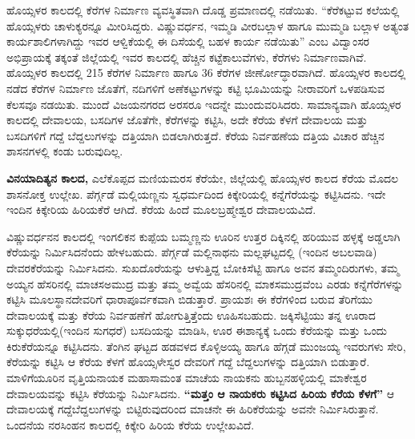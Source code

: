ಹೊಯ್ಸಳರ ಕಾಲದಲ್ಲಿ ಕೆರೆಗಳ ನಿರ್ಮಾಣ ವ್ಯವಸ್ಥಿತವಾಗಿ ದೊಡ್ಡ ಪ್ರಮಾಣದಲ್ಲಿ ನಡೆಯಿತು. “ಕೆರೆಕಟ್ಟುವ ಕಲೆಯಲ್ಲಿ ಹೊಯ್ಸಳರು ಚಾಳುಕ್ಯರನ್ನೂ ಮೀರಿಸಿದ್ದರು. ವಿಷ್ಣುವರ್ಧನ, ಇಮ್ಮಡಿ ವೀರಬಲ್ಲಾಳ ಹಾಗೂ ಮುಮ್ಮಡಿ ಬಲ್ಲಾಳ ಅತ್ಯಂತ ಕಾರ್ಯಶಾಲಿಗಳಾಗಿದ್ದು ಇವರ ಆಳ್ವಿಕೆಯಲ್ಲಿ ಈ ದಿಸೆಯಲ್ಲಿ ಬಹಳ ಕಾರ್ಯ ನಡೆಯಿತು” ಎಂಬ ವಿದ್ವಾಂಸರ ಅಭಿಪ್ರಾಯಕ್ಕೆ ತಕ್ಕಂತೆ ಜಿಲ್ಲೆಯಲ್ಲಿ ಇವರ ಕಾಲದಲ್ಲಿ ಹೆಚ್ಚಿನ ಕಟ್ಟೆಕಾಲುವೆಗಳು, ಕೆರೆಗಳು ನಿರ್ಮಾಣವಾಗಿವೆ. ಹೊಯ್ಸಳರ ಕಾಲದಲ್ಲಿ 215 ಕೆರೆಗಳ ನಿರ್ಮಾಣ ಹಾಗೂ 36 ಕೆರೆಗಳ ಜೀರ್ಣೋದ್ಧಾರವಾಗಿದೆ. ಹೊಯ್ಸಳರ ಕಾಲದಲ್ಲಿ ನಡೆದ ಕೆರೆಗಳ ನಿರ್ಮಾಣ ಜೊತೆಗೆ, ನದಿಗಳಿಗೆ ಅಣೆಕಟ್ಟುಗಳನ್ನು ಕಟ್ಟಿ ಭೂಮಿಯನ್ನು ನೀರಾವರಿಗೆ ಒಳಪಡಿಸುವ ಕೆಲಸವೂ ನಡಯಿತು. ಮುಂದೆ ವಿಜಯನಗರದ ಅರಸರೂ ಇದನ್ನೇ ಮುಂದುವರಿಸಿದರು. ಸಾಮಾನ್ಯವಾಗಿ ಹೊಯ್ಸಳರ ಕಾಲದಲ್ಲಿ ದೇವಾಲಯ, ಬಸದಿಗಳ ಜೊತೆಗೇ, ಕೆರೆಗಳನ್ನು ಕಟ್ಟಿಸಿ, ಅದೇ ಕೆರೆಯ ಕೆಳಗೆ ದೇವಾಲಯ ಮತ್ತು ಬಸದಿಗಳಿಗೆ ಗದ್ದೆ ಬೆದ್ದಲುಗಳನ್ನು ದತ್ತಿಯಾಗಿ ಬಿಡಲಾಗಿರುತ್ತದೆ. ಕೆರೆಯ ನಿರ್ವಹಣೆಯ ದತ್ತಿಯ ವಿಚಾರ ಹೆಚ್ಚಿನ ಶಾಸನಗಳಲ್ಲಿ ಕಂಡು ಬರುವುದಿಲ್ಲ.

\textbf{ವಿನಯಾದಿತ್ಯನ ಕಾಲದ,} ಎಲೆಕೊಪ್ಪದ ಮಣಿಯಮರಸ ಕೆರೆಯೇ, ಜಿಲ್ಲೆಯಲ್ಲಿ ಹೊಯ್ಸಳರ ಕಾಲದ ಕೆರೆಯ ಮೊದಲ ಶಾಸನೋಕ್ತ ಉಲ್ಲೇಖ. ಪೆರ್ಗ್ಗಡೆ ಮಲ್ಲಿಯಣ್ಣನು ಸ್ವಧರ್ಮದಿಂದ ಕಿಕ್ಕೇರಿಯಲ್ಲಿ ಕನ್ನೆಗೆರೆಯನ್ನು ಕಟ್ಟಿಸಿದನು. ಇದೇ ಇಂದಿನ ಕಿಕ್ಕೇರಿಯ ಹಿರಿಯಕೆರೆ ಆಗಿದೆ. ಕೆರೆಯ ಹಿಂದೆ ಮೂಲಬ್ರಹ್ಮೇಶ್ವರ ದೇವಾಲಯವಿದೆ. 

ವಿಷ್ಣುವರ್ಧನನ ಕಾಲದಲ್ಲಿ ಇಂಗಲಿಕನ ಕುಪ್ಪೆಯ ಬಮ್ಮಣ್ಣನು ಊರಿನ ಉತ್ತರ ದಿಕ್ಕಿನಲ್ಲಿ ಹರಿಯುವ ಹಳ್ಳಕ್ಕೆ ಅಡ್ಡಲಾಗಿ ಕೆರೆಯನ್ನು ನಿರ್ಮಿಸಿದನೆಂದು ಹೇಳಬಹುದು. ಪೆರ್ಗ್ಗಡೆ ಮಲ್ಲಿನಾಥನು ಮಲ್ಲಘಟ್ಟದಲ್ಲಿ (ಇಂದಿನ ಅಬಲವಾಡಿ) ದೇವರಕೆರೆಯನ್ನು ನಿರ್ಮಿಸಿದನು. ಸುಖದೊರೆಯನ್ನು ಆಳುತ್ತಿದ್ದ ಬೋಕಿಸೆಟ್ಟಿ ಹಾಗೂ ಅವನ ತಮ್ಮಂದಿರುಗಳು, ತಮ್ಮ ಅಯ್ಯನ ಹೆಸರಿನಲ್ಲಿ ಮಾಚಸಅಮುದ್ರ ಮತ್ತು ತಮ್ಮ ಅವ್ವೆಯ ಹೆಸರಿನಲ್ಲಿ ಮಾಕಸಮುದ್ರವೆಂಬ ಎರಡು ಕನ್ನೆಗೆರೆಗಳನ್ನು ಕಟ್ಟಿಸಿ ಮೂಲಸ್ಥಾನದೇವರಿಗೆ ಧಾರಾಪೂರ್ವಕವಾಗಿ ಬಿಡುತ್ತಾರೆ. ಪ್ರಾಯಶಃ ಈ ಕೆರೆಗಳಿಂದ ಬರುವ ತೆರಿಗೆಯು ದೇವಾಲಯಕ್ಕೆ ಮತ್ತು ಕೆರೆಯ ನಿರ್ವಹಣೆಗೆ ಹೋಗುತ್ತಿತ್ತೆಂದು ಊಹಿಸಬಹುದು. ಜಕ್ಕಿಸೆಟ್ಟಿಯು ತನ್ನ ಊರಾದ ಸುಕ್ಕುಧರೆಯಲ್ಲಿ(ಇಂದಿನ ಸುಗಧರೆ) ಬಸದಿಯನ್ನು ಮಾಡಿಸಿ, ಊರ ಈಶಾನ್ಯಕ್ಕೆ ಒಂದು ಕೆರೆಯನ್ನು ಮತ್ತು ಒಂದು ಕಿರುಕೆರೆಯನ್ನೂ ಕಟ್ಟಿಸಿದನು. ತೆಂಗಿನ ಘಟ್ಟದ ಹಡವಳದ ಕೊಳ್ಳಿಅಯ್ಯ ಹಾಗೂ ಹೆಗ್ಗಡೆ ಮುಂಜಯ್ಯ ಇವರುಗಳು ಸೇರಿ, ಕೆರೆಯನ್ನು ಕಟ್ಟಿಸಿ ಆ ಕೆರೆಯ ಕೆಳಗೆ ಹೊಯ್ಸಳೇಸ್ವರ ದೇವರಿಗೆ ಗದ್ದೆ ಬೆದ್ದಲುಗಳನ್ನು ದತ್ತಿಯಾಗಿ ಬಿಡುತ್ತಾರೆ. ಮಾಳಿಗೆಯೂರಿನ ವೃತ್ತಿಯನಾಯಕ ಮಹಾಸಾಮಂತ ಮಾಚೆಯ ನಾಯಕನು ಹುಬ್ಬನಹಳ್ಳಿಯಲ್ಲಿ ಮಾಕೇಶ್ವರ ದೇವಾಲಯವನ್ನು ಕಟ್ಟಿಸಿ ಕೆರೆಯನ್ನು ನಿರ್ಮಿಸಿದನು. \textbf{“ಮತ್ತಂ ಆ ನಾಯಕರು ಕಟ್ಟಿಸಿದ ಹಿರಿಯ ಕೆರೆಯ ಕೆಳಗೆ”} ಆ ದೇವಾಲಯಕ್ಕೆ ಗದ್ದೆಬೆದ್ದಲುಗಳನ್ನು ಬಿಟ್ಟಿರುವುದರಿಂದ ಮಾಚನೇ ಈ ಹಿರಿಕೆರೆಯನ್ನು ಅವನೇ ನಿರ್ಮಿಸಿರುತ್ತಾನೆ. ಒಂದನೆಯ ನರಸಿಂಹನ ಕಾಲದಲ್ಲಿ ಕಿಕ್ಕೇರಿ ಹಿರಿಯ ಕೆರೆಯ ಉಲ್ಲೇಖವಿದೆ.

